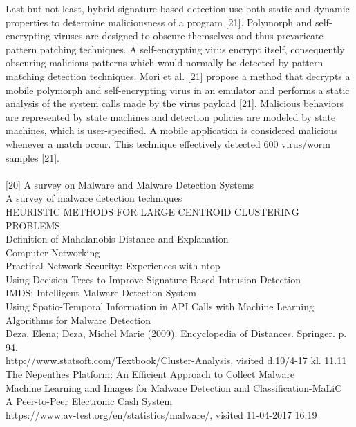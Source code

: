 \documentclass[12pt]{article} %
\begin{document}
Last but not least, hybrid signature-based detection use both static and dynamic properties to determine maliciousness of a program [21]. Polymorph and self-encrypting viruses are designed to obscure themselves and thus prevaricate pattern patching techniques. A self-encrypting virus encrypt itself, consequently obscuring malicious patterns which would normally be detected by pattern matching detection techniques. Mori et al. [21] propose a method that decrypts a mobile polymorph and self-encrypting virus in an emulator and performs a static analysis of the system calls made by the virus payload [21]. Malicious behaviors are represented by state machines and detection policies are modeled by state machines, which is user-specified. A mobile application is considered malicious whenever a match occur. This technique effectively detected 600 virus/worm samples [21]. \\ \\


[20] A survey on Malware and Malware Detection Systems \\
[21] A survey of malware detection techniques \\
[22] HEURISTIC METHODS FOR LARGE CENTROID CLUSTERING PROBLEMS \\
[23] Definition of Mahalanobis Distance and Explanation \\
[24] Computer Networking \\
[25] Practical Network Security: Experiences with ntop \\
[26] Using Decision Trees to Improve Signature-Based Intrusion Detection \\
[27] IMDS: Intelligent Malware Detection System \\
[28] Using Spatio-Temporal Information in API Calls with Machine Learning Algorithms for Malware Detection \\
[29] Deza, Elena; Deza, Michel Marie (2009). Encyclopedia of Distances. Springer. p. 94. \\
[30] http://www.statsoft.com/Textbook/Cluster-Analysis, visited d.10/4-17 kl. 11.11 \\
[31] The Nepenthes Platform: An Efficient Approach to Collect Malware \\
[32] Machine Learning and Images for Malware Detection and Classification-MaLiC \\
[33] A Peer-to-Peer Electronic Cash System \\ 
[34] https://www.av-test.org/en/statistics/malware/, visited 11-04-2017 16:19 \\
\end{document}
